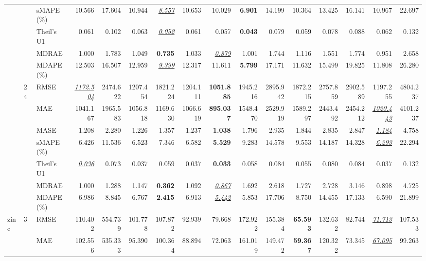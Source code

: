\begin{table}[!htbp]
{\begin{tabular}{lllrrrrrrrrrrrrr}
 &  & sMAPE (\%) & 10.566 & 17.604 & 10.944 & \underline{\textit{8.557}} & 10.653 & 10.029 & \textbf{6.901} & 14.199 & 10.364 & 13.425 & 16.141 & 10.967 & 22.697 \\
 &  & Theil's U1 & 0.061 & 0.102 & 0.063 & \underline{\textit{0.052}} & 0.061 & 0.057 & \textbf{0.043} & 0.079 & 0.059 & 0.078 & 0.088 & 0.062 & 0.132 \\
 &  & MDRAE & 1.000 & 1.783 & 1.049 & \textbf{0.735} & 1.033 & \underline{\textit{0.879}} & 1.001 & 1.744 & 1.116 & 1.551 & 1.774 & 0.951 & 2.658 \\
 &  & MDAPE (\%) & 12.503 & 16.507 & 12.959 & \underline{\textit{9.399}} & 12.317 & 11.611 & \textbf{5.799} & 17.171 & 11.632 & 15.499 & 19.825 & 11.808 & 26.280 \\
\cmidrule(lr){2-16}
 & 24 & RMSE & \underline{\textit{1172.504}} & 2474.622 & 1207.454 & 1821.224 & 1204.111 & \textbf{1051.885} & 1945.216 & 2895.942 & 1872.215 & 2757.859 & 2902.589 & 1197.255 & 4804.237 \\
 &  & MAE & 1041.167 & 1965.583 & 1056.818 & 1169.630 & 1066.619 & \textbf{895.037} & 1548.470 & 2529.919 & 1589.297 & 2443.492 & 2454.212 & \underline{\textit{1020.443}} & 4101.237 \\
 &  & MASE & 1.208 & 2.280 & 1.226 & 1.357 & 1.237 & \textbf{1.038} & 1.796 & 2.935 & 1.844 & 2.835 & 2.847 & \underline{\textit{1.184}} & 4.758 \\
 &  & sMAPE (\%) & 6.426 & 11.536 & 6.523 & 7.346 & 6.582 & \textbf{5.529} & 9.283 & 14.578 & 9.553 & 14.187 & 14.328 & \underline{\textit{6.293}} & 22.294 \\
 &  & Theil's U1 & \underline{\textit{0.036}} & 0.073 & 0.037 & 0.059 & 0.037 & \textbf{0.033} & 0.058 & 0.084 & 0.055 & 0.080 & 0.084 & 0.037 & 0.132 \\
 &  & MDRAE & 1.000 & 1.288 & 1.147 & \textbf{0.362} & 1.092 & \underline{\textit{0.867}} & 1.692 & 2.618 & 1.727 & 2.728 & 3.146 & 0.898 & 4.725 \\
 &  & MDAPE (\%) & 6.986 & 8.845 & 6.767 & \textbf{2.415} & 6.913 & \underline{\textit{5.442}} & 5.853 & 17.706 & 8.750 & 14.455 & 17.133 & 6.590 & 21.899 \\
\midrule
zinc & 3 & RMSE & 110.402 & 554.739 & 101.778 & 107.872 & 92.939 & 79.668 & 172.922 & 155.384 & \textbf{65.593} & 132.632 & 82.744 & \underline{\textit{71.713}} & 107.533 \\
 &  & MAE & 102.556 & 535.333 & 95.390 & 100.364 & 88.894 & 72.063 & 161.019 & 149.472 & \textbf{59.367} & 120.322 & 73.345 & \underline{\textit{67.095}} & 99.263 \\

\end{tabular}}
\end{table}
